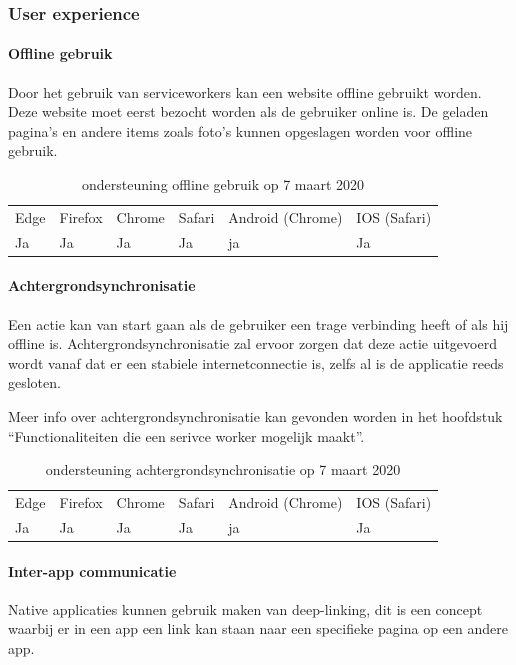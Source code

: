 \subsubsection{User experience}

\paragraph{Offline gebruik}
Door het gebruik van serviceworkers kan een website offline gebruikt worden. Deze website moet eerst bezocht worden als de gebruiker online is. De geladen pagina’s en andere items zoals foto’s kunnen opgeslagen worden voor offline gebruik.

\begin{table}[H]
	\begin{tabular}{llllll}
		Edge & Firefox & Chrome & Safari & Android (Chrome) & IOS (Safari) \\
		Ja   & Ja      &  Ja     & Ja     & ja               & Ja          
	\end{tabular}	
	\caption{ondersteuning offline gebruik op 7 maart 2020}
\end{table}	



\paragraph{Achtergrondsynchronisatie }

Een actie kan van start gaan als de gebruiker een trage verbinding heeft of als hij offline is. Achtergrondsynchronisatie zal ervoor zorgen dat deze actie uitgevoerd wordt vanaf dat er een stabiele internetconnectie is, zelfs al is de applicatie reeds gesloten.

Meer info over achtergrondsynchronisatie kan gevonden worden in het hoofdstuk “Functionaliteiten die een serivce worker mogelijk maakt”.


\begin{table}[H]
	\centering
	\begin{tabular}{llllll}
		Edge & Firefox & Chrome & Safari & Android (Chrome) & IOS (Safari) \\
		Ja   & Ja      &  Ja     & Ja     & ja               & Ja          
	\end{tabular}	
	\caption{ondersteuning achtergrondsynchronisatie op 7 maart 2020}
\end{table}


\paragraph{Inter-app communicatie}
Native applicaties kunnen gebruik maken van deep-linking, dit is een concept waarbij er in een app een link kan staan naar een specifieke pagina op een andere app.

